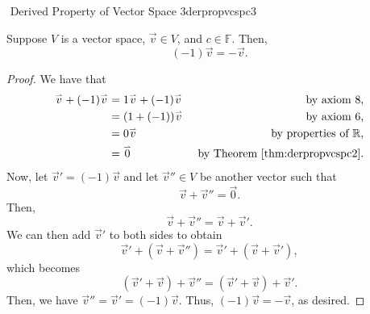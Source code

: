         \pagebreak
        \begin{theorem}{\Stop\,\,Derived Property of Vector Space 3}{derpropvcspc3}

            Suppose \(V\) is a vector space, \(\vec{v}\in V\), and \(c\in\mathbb{F}\). Then,
            \begin{equation*}
                (-1)\vec{v}=-\vec{v}.
            \end{equation*}
            \begin{proof}
                We have that
                \begin{align*}
                    \vec{v}+(-1)\vec{v}&=1\vec{v}+(-1)\vec{v} &\text{ by axiom \(8\),} \\
                    &=(1+(-1))\vec{v} &\text{ by axiom \(6\),} \\
                    &=0\vec{v} &\text{ by properties of \(\mathbb{R}\),} \\
                    &=\vec{0} &\text{ by Theorem \ref{thm:derpropvcspc2}.}
                \end{align*}
                Now, let \(\vec{v}'=(-1)\vec{v}\) and let \(\vec{v}''\in V\) be another vector such that
                \begin{equation*}
                    \vec{v}+\vec{v}''=\vec{0}.
                \end{equation*}
                Then,
                \begin{equation*}
                    \vec{v}+\vec{v}''=\vec{v}+\vec{v}'.
                \end{equation*}
                We can then add \(\vec{v}'\) to both sides to obtain
                \begin{equation*}
                    \vec{v}'+(\vec{v}+\vec{v}'')=\vec{v}'+(\vec{v}+\vec{v}'),
                \end{equation*}
                which becomes
                \begin{equation*}
                    (\vec{v}'+\vec{v})+\vec{v}''=(\vec{v}'+\vec{v})+\vec{v}'.
                \end{equation*}
                Then, we have \(\vec{v}''=\vec{v}'=(-1)\vec{v}\). Thus, \((-1)\vec{v}=-\vec{v}\), as desired.
            \end{proof}
        \end{theorem}
